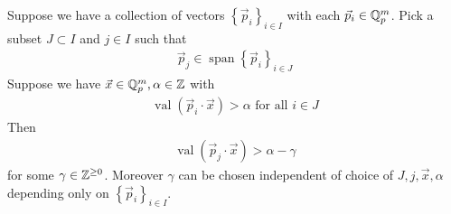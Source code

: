 \documentclass{amsart}
\newcommand{\curly}[1]{\left\{#1\right\}}
\DeclareMathOperator{\vecspan}{span}
\DeclareMathOperator{\val}{val}
\begin{document}
%


\begin{Claim}
	Suppose we have a collection of vectors $\curly{\vec p_i}_{i \in I}$ with each $\vec p_i \in \mathbb{Q}_p^m$.
	Pick a subset $J \subset I$ and $j \in I$ such that
	\begin{align*}
		\vec p_j \in \vecspan \curly{\vec p_i}_{i \in J}
	\end{align*}
	Suppose we have $\vec x \in \mathbb{Q}_p^m, \alpha \in \mathbb{Z}$ with
	\begin{align*}
		\val(\vec p_i \cdot \vec x) > \alpha \text{ for all } i \in J
	\end{align*}
	Then
	\begin{align*}
		\val(\vec p_j \cdot \vec x) > \alpha - \gamma
	\end{align*}
	for some $\gamma \in \mathbb{Z}^{\geq 0}$.
	Moreover $\gamma$ can be chosen independent of choice of $J, j, \vec x, \alpha$ depending only on $\curly{\vec p_i}_{i \in I}$.
\end{Claim}
\end{document}
